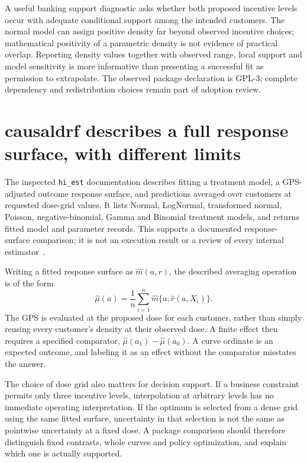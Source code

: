 A useful banking support diagnostic asks whether both proposed incentive levels
occur with adequate conditional support among the intended customers. The
normal model can assign positive density far beyond observed incentive choices;
mathematical positivity of a parametric density is not evidence of practical
overlap. Reporting density values together with observed range, local support
and model sensitivity is more informative than presenting a successful fit as
permission to extrapolate. The observed package declaration is GPL-3; complete
dependency and redistribution choices remain part of adoption review.

\section{causaldrf describes a full response surface, with different limits}

The inspected \texttt{hi\_est} documentation describes fitting a treatment
model, a GPS-adjusted outcome response surface, and predictions averaged over
customers at requested dose-grid values. It lists Normal, LogNormal, transformed
normal, Poisson, negative-binomial, Gamma and Binomial treatment models, and
returns fitted model and parameter records. This supports a documented
response-surface comparison; it is not an execution result or a review of every
internal estimator~\citep{v13_sw_causaldrf}.

Writing a fitted response surface as $\widehat m(a,r)$, the described averaging
operation is of the form
\[
 \widehat\mu(a)=\frac1n\sum_{i=1}^n
                      \widehat m\{a,\widehat r(a,X_i)\}.
\]
The GPS is evaluated at the proposed dose for each customer, rather than simply
reusing every customer's density at their observed dose. A finite effect then
requires a specified comparator, $\widehat\mu(a_1)-\widehat\mu(a_0)$.
A curve ordinate is an expected outcome, and labeling it as an effect without
the comparator misstates the answer.

The choice of dose grid also matters for decision support. If a business
constraint permits only three incentive levels, interpolation at arbitrary
levels has no immediate operating interpretation. If the optimum is selected
from a dense grid using the same fitted surface, uncertainty in that selection
is not the same as pointwise uncertainty at a fixed dose. A package comparison
should therefore distinguish fixed contrasts, whole curves and policy
optimization, and explain which one is actually supported.

